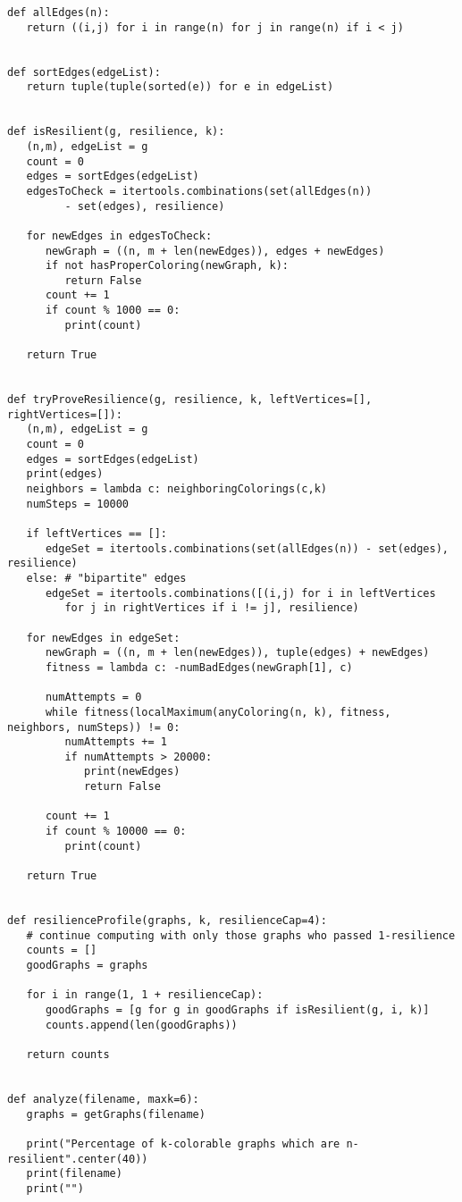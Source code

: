 \begin{lstlisting}[caption={The sourcecode for computing resilience by brute
force and heuristically-guided search.},label=listing:resilience]
def allEdges(n):
   return ((i,j) for i in range(n) for j in range(n) if i < j)


def sortEdges(edgeList):
   return tuple(tuple(sorted(e)) for e in edgeList)


def isResilient(g, resilience, k):
   (n,m), edgeList = g
   count = 0
   edges = sortEdges(edgeList)
   edgesToCheck = itertools.combinations(set(allEdges(n)) 
         - set(edges), resilience)

   for newEdges in edgesToCheck:
      newGraph = ((n, m + len(newEdges)), edges + newEdges)
      if not hasProperColoring(newGraph, k):
         return False
      count += 1
      if count % 1000 == 0:
         print(count)

   return True


def tryProveResilience(g, resilience, k, leftVertices=[], rightVertices=[]):
   (n,m), edgeList = g
   count = 0
   edges = sortEdges(edgeList)
   print(edges)
   neighbors = lambda c: neighboringColorings(c,k)
   numSteps = 10000

   if leftVertices == []:
      edgeSet = itertools.combinations(set(allEdges(n)) - set(edges), resilience)
   else: # "bipartite" edges
      edgeSet = itertools.combinations([(i,j) for i in leftVertices 
         for j in rightVertices if i != j], resilience)

   for newEdges in edgeSet:
      newGraph = ((n, m + len(newEdges)), tuple(edges) + newEdges)
      fitness = lambda c: -numBadEdges(newGraph[1], c)

      numAttempts = 0
      while fitness(localMaximum(anyColoring(n, k), fitness, neighbors, numSteps)) != 0:
         numAttempts += 1
         if numAttempts > 20000:
            print(newEdges)
            return False

      count += 1
      if count % 10000 == 0:
         print(count)

   return True


def resilienceProfile(graphs, k, resilienceCap=4):
   # continue computing with only those graphs who passed 1-resilience
   counts = []
   goodGraphs = graphs

   for i in range(1, 1 + resilienceCap):
      goodGraphs = [g for g in goodGraphs if isResilient(g, i, k)]
      counts.append(len(goodGraphs))

   return counts


def analyze(filename, maxk=6):
   graphs = getGraphs(filename)

   print("Percentage of k-colorable graphs which are n-resilient".center(40))
   print(filename)
   print("")


\end{lstlisting}
